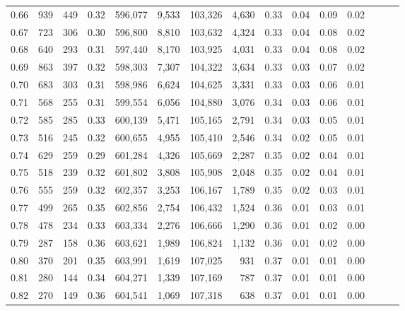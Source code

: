 \begin{tabular}{rrrrrrrrrrrrrrr}
0.66 &     939 &    449 &  0.32 &  596,077 &    9,533 &  103,326 &    4,630 &  0.33 &  0.04 &  0.09 &      0.02 \\
0.67 &     723 &    306 &  0.30 &  596,800 &    8,810 &  103,632 &    4,324 &  0.33 &  0.04 &  0.08 &      0.02 \\
0.68 &     640 &    293 &  0.31 &  597,440 &    8,170 &  103,925 &    4,031 &  0.33 &  0.04 &  0.08 &      0.02 \\
0.69 &     863 &    397 &  0.32 &  598,303 &    7,307 &  104,322 &    3,634 &  0.33 &  0.03 &  0.07 &      0.02 \\
0.70 &     683 &    303 &  0.31 &  598,986 &    6,624 &  104,625 &    3,331 &  0.33 &  0.03 &  0.06 &      0.01 \\
0.71 &     568 &    255 &  0.31 &  599,554 &    6,056 &  104,880 &    3,076 &  0.34 &  0.03 &  0.06 &      0.01 \\
0.72 &     585 &    285 &  0.33 &  600,139 &    5,471 &  105,165 &    2,791 &  0.34 &  0.03 &  0.05 &      0.01 \\
0.73 &     516 &    245 &  0.32 &  600,655 &    4,955 &  105,410 &    2,546 &  0.34 &  0.02 &  0.05 &      0.01 \\
0.74 &     629 &    259 &  0.29 &  601,284 &    4,326 &  105,669 &    2,287 &  0.35 &  0.02 &  0.04 &      0.01 \\
0.75 &     518 &    239 &  0.32 &  601,802 &    3,808 &  105,908 &    2,048 &  0.35 &  0.02 &  0.04 &      0.01 \\
0.76 &     555 &    259 &  0.32 &  602,357 &    3,253 &  106,167 &    1,789 &  0.35 &  0.02 &  0.03 &      0.01 \\
0.77 &     499 &    265 &  0.35 &  602,856 &    2,754 &  106,432 &    1,524 &  0.36 &  0.01 &  0.03 &      0.01 \\
0.78 &     478 &    234 &  0.33 &  603,334 &    2,276 &  106,666 &    1,290 &  0.36 &  0.01 &  0.02 &      0.00 \\
0.79 &     287 &    158 &  0.36 &  603,621 &    1,989 &  106,824 &    1,132 &  0.36 &  0.01 &  0.02 &      0.00 \\
0.80 &     370 &    201 &  0.35 &  603,991 &    1,619 &  107,025 &      931 &  0.37 &  0.01 &  0.01 &      0.00 \\
0.81 &     280 &    144 &  0.34 &  604,271 &    1,339 &  107,169 &      787 &  0.37 &  0.01 &  0.01 &      0.00 \\
0.82 &     270 &    149 &  0.36 &  604,541 &    1,069 &  107,318 &      638 &  0.37 &  0.01 &  0.01 &      0.00 \\

\end{tabular}
